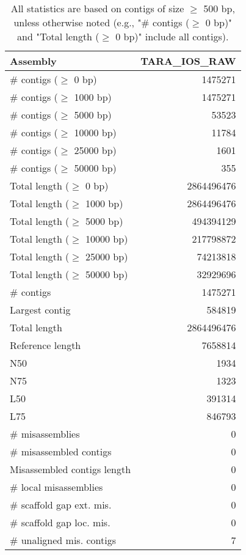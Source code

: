 \documentclass[12pt,a4paper]{article}
\begin{document}
\begin{table}[ht]
\begin{center}
\caption{All statistics are based on contigs of size $\geq$ 500 bp, unless otherwise noted (e.g., "\# contigs ($\geq$ 0 bp)" and "Total length ($\geq$ 0 bp)" include all contigs).}
\begin{tabular}{|l*{1}{|r}|}
\hline
Assembly & TARA\_IOS\_RAW \\ \hline
\# contigs ($\geq$ 0 bp) & 1475271 \\ \hline
\# contigs ($\geq$ 1000 bp) & 1475271 \\ \hline
\# contigs ($\geq$ 5000 bp) & 53523 \\ \hline
\# contigs ($\geq$ 10000 bp) & 11784 \\ \hline
\# contigs ($\geq$ 25000 bp) & 1601 \\ \hline
\# contigs ($\geq$ 50000 bp) & 355 \\ \hline
Total length ($\geq$ 0 bp) & 2864496476 \\ \hline
Total length ($\geq$ 1000 bp) & 2864496476 \\ \hline
Total length ($\geq$ 5000 bp) & 494394129 \\ \hline
Total length ($\geq$ 10000 bp) & 217798872 \\ \hline
Total length ($\geq$ 25000 bp) & 74213818 \\ \hline
Total length ($\geq$ 50000 bp) & 32929696 \\ \hline
\# contigs & 1475271 \\ \hline
Largest contig & 584819 \\ \hline
Total length & 2864496476 \\ \hline
Reference length & 7658814 \\ \hline
N50 & 1934 \\ \hline
N75 & 1323 \\ \hline
L50 & 391314 \\ \hline
L75 & 846793 \\ \hline
\# misassemblies & 0 \\ \hline
\# misassembled contigs & 0 \\ \hline
Misassembled contigs length & 0 \\ \hline
\# local misassemblies & 0 \\ \hline
\# scaffold gap ext. mis. & 0 \\ \hline
\# scaffold gap loc. mis. & 0 \\ \hline
\# unaligned mis. contigs & 7 \\ \hline

\end{tabular}
\end{center}
\end{table}
\end{document}
